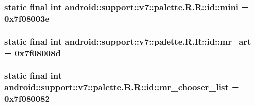 \hypertarget{classandroid_1_1support_1_1v7_1_1palette_1_1_r_1_1id_c76643351399c89445f52bce2905eda9}{
\subsubsection[{mini}]{\setlength{\rightskip}{0pt plus 5cm}static final int android::support::v7::palette.R.R::id::mini = 0x7f08003e}}
\label{classandroid_1_1support_1_1v7_1_1palette_1_1_r_1_1id_c76643351399c89445f52bce2905eda9}


\hypertarget{classandroid_1_1support_1_1v7_1_1palette_1_1_r_1_1id_ab0747d4cbda8d928ba8408e8a76ca07}{
\subsubsection[{mr\_\-art}]{\setlength{\rightskip}{0pt plus 5cm}static final int android::support::v7::palette.R.R::id::mr\_\-art = 0x7f08008d}}
\label{classandroid_1_1support_1_1v7_1_1palette_1_1_r_1_1id_ab0747d4cbda8d928ba8408e8a76ca07}


\hypertarget{classandroid_1_1support_1_1v7_1_1palette_1_1_r_1_1id_1726fac07fa05f1808bad53f6ce49bb7}{
\subsubsection[{mr\_\-chooser\_\-list}]{\setlength{\rightskip}{0pt plus 5cm}static final int android::support::v7::palette.R.R::id::mr\_\-chooser\_\-list = 0x7f080082}}
\label{classandroid_1_1support_1_1v7_1_1palette_1_1_r_1_1id_1726fac07fa05f1808bad53f6ce49bb7}


